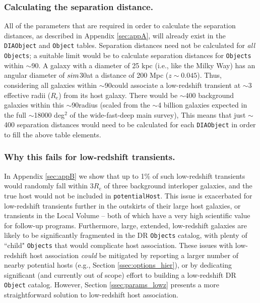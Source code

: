 \documentclass[DM,authoryear,toc]{lsstdoc}
\begin{document}
\subsubsection{Calculating the separation distance.}\label{sssec:params_trans_comp}
All of the parameters that are required in order to calculate the separation distances, as described in Appendix \ref{sec:appA}, will already exist in the {\tt DIAObject} and {\tt Object} tables.
Separation distances need not be calculated for \textit{all} {\tt Objects}; a suitable limit would be to calculate separation distances for {\tt Objects} within $\sim$90\arcsec.
A galaxy with a diameter of 25 kpc (i.e., like the Milky Way) has an angular diameter of $\\sim$30\arcsec at a distance of 200 Mpc ($z\sim0.045$).
Thus, considering all galaxies within $\sim$90\arcsec could associate a low-redshift transient at $\sim$3 effective radii ($R_e$) from its host galaxy.
There would be $\sim$400 background galaxies within this $\sim$90\arcsec radius (scaled from the $\sim$4 billion galaxies expected in the full $\sim$18000 deg$^2$ of the wide-fast-deep main survey), 
This means that just $\sim$400 separation distances would need to be calculated for each {\tt DIAObject} in order to fill the above table elements. 

\subsubsection{Why this fails for low-redshift transients.}\label{sssec:params_trans_fail}
In Appendix \ref{sec:appB} we show that up to 1\% of such low-redshift transients would randomly fall within $3R_e$ of three background interloper galaxies, and the true host would not be included in {\tt potentialHost}.
This issue is exacerbated for low-redshift transients further in the outskirts of their large host galaxies, or transients in the Local Volume -- both of which have a very high scientific value for follow-up programs.
Furthermore, large, extended, low-redshift galaxies are likely to be significantly fragmented in the DR {\tt Objects} catalog, with plenty of ``child" {\tt Objects} that would complicate host association.
These issues with low-redshift host association \textit{could} be mitigated by reporting a larger number of nearby potential hosts (e.g., Section \ref{ssec:options_hier}), or by dedicating significant (and currently out of scope) effort to building a low-redshift DR {\tt Object} catalog.
However, Section \ref{ssec:params_lowz} presents a more straightforward solution to low-redshift host association.
\end{document}
